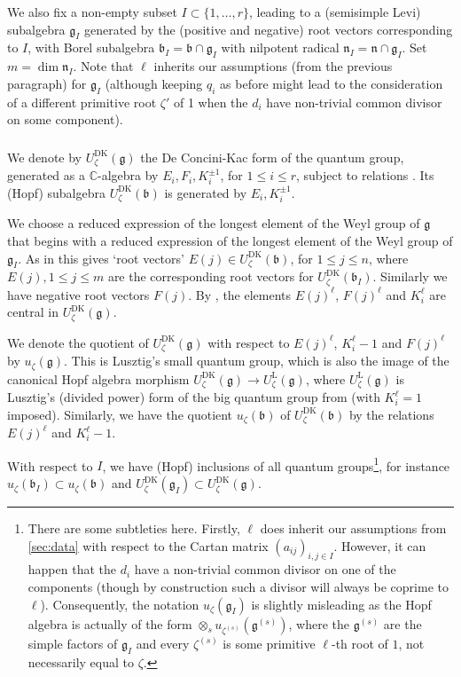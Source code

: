 \documentclass{amsart}
\numberwithin{equation}{section}
\theoremstyle{definition}
\theoremstyle{remark}
\newcommand{\fg}{\mathfrak{g}}
\newcommand{\fb}{\mathfrak{b}}
\newcommand{\fn}{\mathfrak{n}}
\newcommand{\mC}{\mathbb{C}}
\newcommand{\DK}{\mathrm{DK}}
\renewcommand{\L}{\mathrm{L}}
\begin{document}
We also fix a non-empty subset $I\subset \{1,\ldots, r\}$, leading to a (semisimple Levi) subalgebra $\fg_I$ generated by the (positive and negative) root vectors corresponding to $I$, with Borel subalgebra $\fb_I=\fb\cap \fg_I$ with nilpotent radical $\fn_I=\fn\cap\fg_I$. Set $m=\dim \fn_I$. Note that $\ell$ inherits our assumptions (from the previous paragraph) for $\fg_I$ (although keeping $q_i$ as before might lead to the consideration of a different primitive root $\zeta'$ of 1 when the $d_i$ have non-trivial common divisor on some component). 


\subsubsection{}
We denote by $U^{\DK}_\zeta(\fg)$ the De Concini-Kac form of the quantum group, generated as a $\mC$-algebra by $E_i, F_i, K_i^{\pm 1}$, for $1\le i\le r$, subject to relations \cite[1.2.1-1.2.5]{DK}. Its (Hopf) subalgebra $U^{\DK}_\zeta(\fb)$ is generated by $E_i,K_i^{\pm 1}$.


We choose a reduced expression of the longest element of the Weyl group of $\fg$ that begins with a reduced expression of the longest element of the Weyl group of $\fg_I$. As in \cite[\S1]{DK} this gives `root vectors' $E(j)\in U_\zeta^{\DK}(\fb)$, for $1\le j\le n$, where $E(j),1\le j\le m$ are the corresponding root vectors for $U_\zeta^{\DK}(\fb_I)$. Similarly we have negative root vectors $F(j)$.
By \cite[Lemma~3.1]{DK}, the elements $E(j)^{\ell}$, $F(j)^\ell$ and $K_i^{\ell}$ are central in $U^{\DK}_\zeta(\fg)$.

We denote the quotient of $U^{\DK}_\zeta(\fg)$ with respect to $E(j)^{\ell}$, $K_i^{\ell}-1$ and $F(j)^\ell$ by $u_\zeta(\fg)$. This is Lusztig's small quantum group, which is also the image of the canonical Hopf algebra morphism $U_\zeta^{\DK}(\fg)\to U_\zeta^{\L}(\fg)$, where $U_\zeta^{\L}(\fg)$ is Lusztig's (divided power) form of the big quantum group from \cite{Lu} (with $K_i^\ell=1$ imposed). Similarly, we have the quotient $u_\zeta(\fb)$ of $U^{\DK}_\zeta(\fb)$ by the relations  $E(j)^{\ell}$ and  $K_i^{\ell}-1$.

With respect to $I$, we have (Hopf) inclusions of all quantum groups\footnote{There are some subtleties here. Firstly, $\ell$ does inherit our assumptions from \ref{sec:data} with respect to the Cartan matrix $(a_{ij})_{i,j\in I}$. However, it can happen that the $d_i$ have a non-trivial common divisor on one of the components (though by construction such a divisor will always be coprime to $\ell$). Consequently, the notation $u_\zeta(\fg_I)$ is slightly misleading as the Hopf algebra is actually of the form $\otimes_s u_{\zeta^{(s)}}(\fg^{(s)})$, where the $\fg^{(s)}$ are the simple factors of $\fg_I$ and every $\zeta^{(s)}$ is some primitive $\ell$-th root of $1$, not necessarily equal to $\zeta$.}, for instance $u_\zeta(\fb_I)\subset u_\zeta(\fb)$ and $U^{\DK}_\zeta(\fg_I)\subset U^{\DK}_\zeta(\fg)$.
\end{document}
